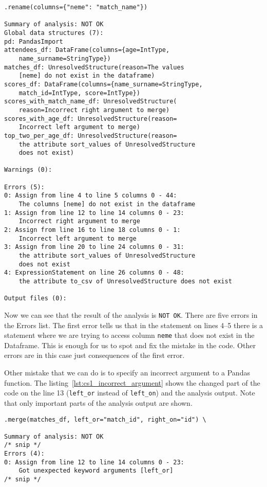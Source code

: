 \begin{lstlisting}[caption=Misspelled column on rename function and analysis output, label={lst:cs1_misspelled_column}, captionpos=b]
    .rename(columns={"neme": "match_name"})

Summary of analysis: NOT OK
Global data structures (7):
pd: PandasImport
attendees_df: DataFrame(columns={age=IntType,
    name_surname=StringType})
matches_df: UnresolvedStructure(reason=The values
    [neme] do not exist in the dataframe)
scores_df: DataFrame(columns={name_surname=StringType,
    match_id=IntType, score=IntType})
scores_with_match_name_df: UnresolvedStructure(
    reason=Incorrect right argument to merge)
scores_with_age_df: UnresolvedStructure(reason=
    Incorrect left argument to merge)
top_two_per_age_df: UnresolvedStructure(reason=
    the attribute sort_values of UnresolvedStructure
    does not exist)

Warnings (0):

Errors (5):
0: Assign from line 4 to line 5 columns 0 - 44:
    The columns [neme] do not exist in the dataframe
1: Assign from line 12 to line 14 columns 0 - 23:
    Incorrect right argument to merge
2: Assign from line 16 to line 18 columns 0 - 1:
    Incorrect left argument to merge
3: Assign from line 20 to line 24 columns 0 - 31:
    the attribute sort_values of UnresolvedStructure
    does not exist
4: ExpressionStatement on line 26 columns 0 - 48:
    the attribute to_csv of UnresolvedStructure does not exist

Output files (0):
\end{lstlisting}

Now we can see that the result of the analysis is \verb|NOT OK|.
There are five errors in the Errors list.
The first error tells us that in the statement on lines 4--5 there is a statement where we are trying to access column
\verb|neme| that does not exist in the Dataframe.
This is enough for us to spot and fix the mistake in the code.
Other errors are in this case just consequences of the first error.

Other mistake that we can do is to specify an incorrect argument to a Pandas function.
The listing~\ref{lst:cs1_incorrect_argument} shows the changed part of the code on the line 13 (\verb|left_or| instead of
\verb|left_on|) and the analysis output.
Note that only important parts of the analysis output are shown.

\begin{lstlisting}[caption=Incorrectly specified argument and analysis output, label={lst:cs1_incorrect_argument}, captionpos=b]
    .merge(matches_df, left_or="match_id", right_on="id") \

Summary of analysis: NOT OK
/* snip */
Errors (4):
0: Assign from line 12 to line 14 columns 0 - 23:
    Got unexpected keyword arguments [left_or]
/* snip */
\end{lstlisting}

